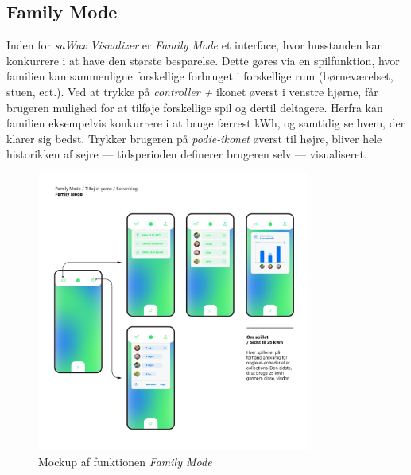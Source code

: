 \subsection{Family Mode}
Inden for \emph{saWux Visualizer} er \emph{Family Mode} et interface, hvor husstanden kan konkurrere i at have den største besparelse. Dette gøres via en spilfunktion, hvor familien kan sammenligne forskellige forbruget i forskellige rum (børneværelset, stuen, ect.). Ved at trykke på \emph{controller +} ikonet øverst i venstre hjørne, får brugeren mulighed for at tilføje forskellige spil og dertil deltagere. Herfra kan familien eksempelvis konkurrere i at bruge færrest kWh, og samtidig se hvem, der klarer sig bedst. Trykker brugeren på \emph{podie-ikonet} øverst til højre, bliver hele historikken af sejre — tidsperioden definerer brugeren selv — visualiseret.
\begin{figure}[H]
    \centering
    \includegraphics[width=0.8\textwidth]{Images/Kids mode.png}
    \caption[\emph{Family Mode} mockup]{Mockup af funktionen \emph{Family Mode}}
    \label{img:teknisk:kidsmode}
\end{figure}


